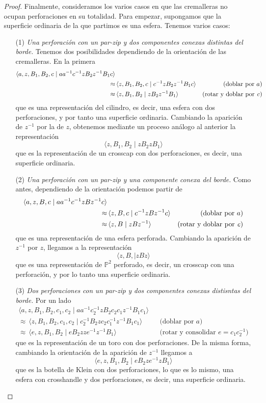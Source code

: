 \documentclass[10pt]{report}
\newcommand{\Proyectivo}{\mathbb{P}^2}
\theoremstyle{definition}
\begin{document}
\begin{proof}
Finalmente, consideramos los varios casos en que las cremalleras no ocupan perforaciones en su totalidad. Para empezar, supongamos que la superficie ordinaria de la que partimos es una esfera. Tenemos varios casos:
\begin{itemize}
\item[(1)] \textit{Una perforación con un par-zip y dos componentes conexas distintas del borde.} Tenemos dos posibilidades dependiendo de la orientación de las cremalleras. En la primera 
\begin{align*}
\langle a,z,B_1,B_2,c\mid aa^{-1} c^{-1}zB_2z^{-1}B_1c\rangle & & \\
\approx & \, \langle z,B_1,B_2,c\mid c^{-1}zB_2z^{-1}B_1c\rangle &\text{(doblar por } a\text{)}\\
\approx & \, \langle z,B_1,B_2\mid zB_2z^{-1}B_1\rangle &\text{(rotar y doblar por \textit{c})}
\end{align*}
que es una representación del cilindro, es decir, una esfera con dos perforaciones, y por tanto una superficie ordinaria. Cambiando la aparición de $z^{-1}$ por la de $z$, obtenemos mediante un proceso análogo al anterior la representación
\[ \langle z,B_1,B_2\mid zB_2zB_1 \rangle
\]
que es la representación de un crosscap con dos perforaciones, es decir, una superficie ordinaria.
\item[(2)] \textit{Una perforación con un par-zip y una componente conexa del borde.} Como antes, dependiendo de la orientación podemos partir de 
\begin{align*}
\langle a,z,B,c\mid aa^{-1} c^{-1}zBz^{-1}c\rangle & & \\
\approx & \, \langle z,B,c\mid c^{-1}zBz^{-1}c\rangle &\text{(doblar por } a\text{)}\\
\approx & \, \langle z,B\mid zBz^{-1}\rangle &\text{(rotar y doblar por \textit{c})}
\end{align*}
que es una representación de una esfera perforada. Cambiando la aparición de $z^{-1}$ por $z$, llegamos a la representación
\[
\langle z,B,\mid zBz\rangle
\]
que es una representación de $\Proyectivo$ perforado, es decir, un crosscap con una perforación, y por lo tanto una superficie ordinaria.
\item[(3)] \textit{Dos perforaciones con un par-zip y dos componentes conexas distisntas del borde.} Por un lado
\begin{align*}
\langle a,z,B_1,B_2,c_1,c_2\mid aa^{-1} c_2^{-1}zB_2c_2c_1z^{-1}B_1c_1\rangle & & \\
\approx  \, \langle z,B_1,B_2,c_1,c_2\mid c_2^{-1}B_2zc_2c_1^{-1}z^{-1}B_1c_1\rangle &&\text{(doblar por } a\text{)}\\
\approx  \, \langle e,z,B_1,B_2\mid eB_2zze^{-1}z^{-1}B_1\rangle &&\text{(rotar y consolidar } e=c_1c_2^{-1} \text{)}
\end{align*}
que es la representación de un toro con dos perforaciones. De la misma forma, cambiando la orientación de la aparición de $z^{-1}$ llegamos a 
\[
\langle e,z,B_1,B_2\mid eB_2ze^{-1}zB_1\rangle
\]
que es la botella de Klein con dos perforaciones, lo que es lo mismo, una esfera con crosshandle y dos perforaciones, es decir, una superficie ordinaria.


\end{itemize}
\end{proof}
\end{document}

